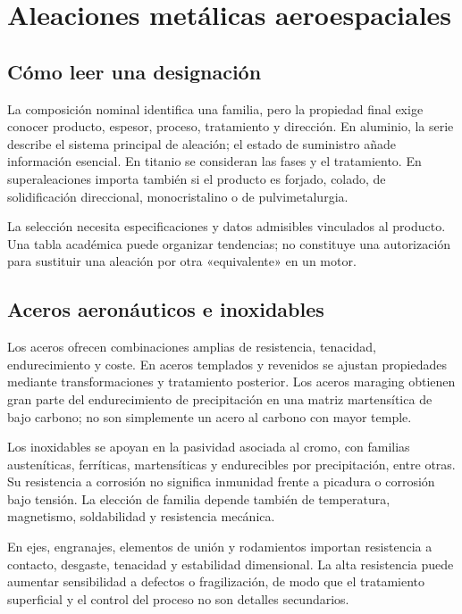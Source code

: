 \chapter{Aleaciones metálicas aeroespaciales}\label{ch:07}
\section{Cómo leer una designación}
La composición nominal identifica una familia, pero la propiedad final exige conocer producto, espesor, proceso, tratamiento y dirección. En aluminio, la serie describe el sistema principal de aleación; el estado de suministro añade información esencial. En titanio se consideran las fases y el tratamiento. En superaleaciones importa también si el producto es forjado, colado, de solidificación direccional, monocristalino o de pulvimetalurgia.

La selección necesita especificaciones y datos admisibles vinculados al producto. Una tabla académica puede organizar tendencias; no constituye una autorización para sustituir una aleación por otra «equivalente» en un motor.
\section{Aceros aeronáuticos e inoxidables}
Los aceros ofrecen combinaciones amplias de resistencia, tenacidad, endurecimiento y coste. En aceros templados y revenidos se ajustan propiedades mediante transformaciones y tratamiento posterior. Los aceros maraging obtienen gran parte del endurecimiento de precipitación en una matriz martensítica de bajo carbono; no son simplemente un acero al carbono con mayor temple.

Los inoxidables se apoyan en la pasividad asociada al cromo, con familias austeníticas, ferríticas, martensíticas y endurecibles por precipitación, entre otras. Su resistencia a corrosión no significa inmunidad frente a picadura o corrosión bajo tensión. La elección de familia depende también de temperatura, magnetismo, soldabilidad y resistencia mecánica.

En ejes, engranajes, elementos de unión y rodamientos importan resistencia a contacto, desgaste, tenacidad y estabilidad dimensional. La alta resistencia puede aumentar sensibilidad a defectos o fragilización, de modo que el tratamiento superficial y el control del proceso no son detalles secundarios.
